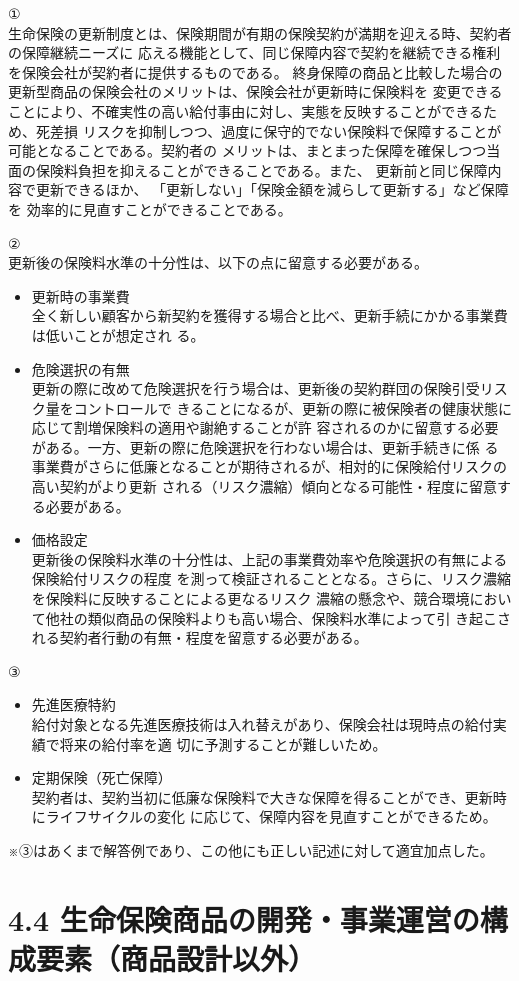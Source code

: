 \documentclass[report,gutter=10mm,fore-edge=10mm,uplatex,dvipdfmx]{jlreq}
\begin{document}
①\\
生命保険の更新制度とは、保険期間が有期の保険契約が満期を迎える時、契約者の保障継続ニーズに
応える機能として、同じ保障内容で契約を継続できる権利を保険会社が契約者に提供するものである。
終身保障の商品と比較した場合の更新型商品の保険会社のメリットは、保険会社が更新時に保険料を
変更できることにより、不確実性の高い給付事由に対し、実態を反映することができるため、死差損
リスクを抑制しつつ、過度に保守的でない保険料で保障することが可能となることである。契約者の
メリットは、まとまった保障を確保しつつ当面の保険料負担を抑えることができることである。また、
更新前と同じ保障内容で更新できるほか、
「更新しない」「保険金額を減らして更新する」など保障を
効率的に見直すことができることである。

②\\
更新後の保険料水準の十分性は、以下の点に留意する必要がある。
\begin{itemize}
 \item 更新時の事業費\\
 全く新しい顧客から新契約を獲得する場合と比べ、更新手続にかかる事業費は低いことが想定され
 る。
 \item 危険選択の有無\\
 更新の際に改めて危険選択を行う場合は、更新後の契約群団の保険引受リスク量をコントロールで
 きることになるが、更新の際に被保険者の健康状態に応じて割増保険料の適用や謝絶することが許
 容されるのかに留意する必要がある。一方、更新の際に危険選択を行わない場合は、更新手続きに係
 る事業費がさらに低廉となることが期待されるが、相対的に保険給付リスクの高い契約がより更新
 される（リスク濃縮）傾向となる可能性・程度に留意する必要がある。
 \item 価格設定\\
 更新後の保険料水準の十分性は、上記の事業費効率や危険選択の有無による保険給付リスクの程度
 を測って検証されることとなる。さらに、リスク濃縮を保険料に反映することによる更なるリスク
 濃縮の懸念や、競合環境において他社の類似商品の保険料よりも高い場合、保険料水準によって引
 き起こされる契約者行動の有無・程度を留意する必要がある。
\end{itemize}
③
\begin{itemize}
 \item 先進医療特約\\
 給付対象となる先進医療技術は入れ替えがあり、保険会社は現時点の給付実績で将来の給付率を適
 切に予測することが難しいため。
 \item 定期保険（死亡保障）\\
 契約者は、契約当初に低廉な保険料で大きな保障を得ることができ、更新時にライフサイクルの変化
 に応じて、保障内容を見直すことができるため。
\end{itemize}
※③はあくまで解答例であり、この他にも正しい記述に対して適宜加点した。

\section{4.4 生命保険商品の開発・事業運営の構成要素（商品設計以外）}
\end{document}
